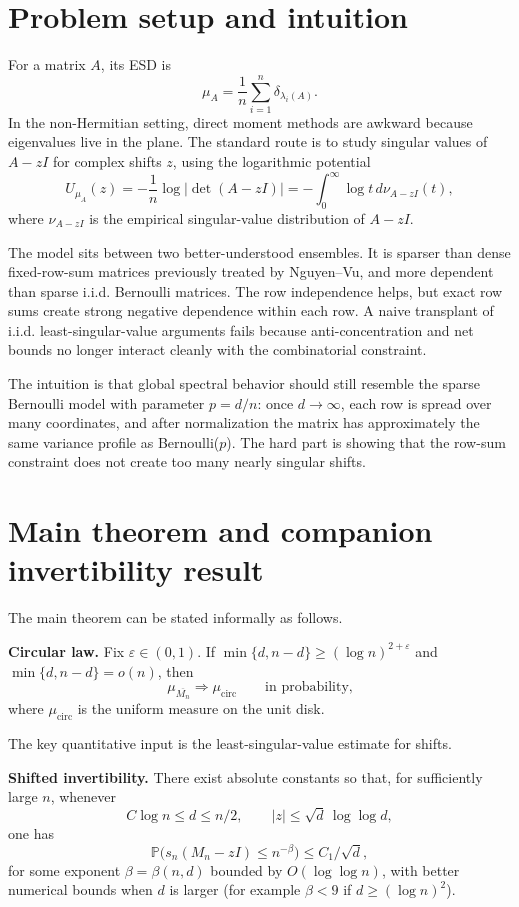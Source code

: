 \documentclass[11pt]{article}
\begin{document}
\section*{Problem setup and intuition}
For a matrix $A$, its ESD is
\[
\mu_A=\frac1n\sum_{i=1}^n \delta_{\lambda_i(A)}.
\]
In the non-Hermitian setting, direct moment methods are awkward because eigenvalues live in the plane. The standard route is to study singular values of $A-zI$ for complex shifts $z$, using the logarithmic potential
\[
U_{\mu_A}(z)=-\frac1n\log|\det(A-zI)|
      =-\int_0^{\infty}\log t\,d\nu_{A-zI}(t),
\]
where $\nu_{A-zI}$ is the empirical singular-value distribution of $A-zI$.

The model sits between two better-understood ensembles. It is sparser than dense fixed-row-sum matrices previously treated by Nguyen--Vu, and more dependent than sparse i.i.d. Bernoulli matrices. The row independence helps, but exact row sums create strong negative dependence within each row. A naive transplant of i.i.d. least-singular-value arguments fails because anti-concentration and net bounds no longer interact cleanly with the combinatorial constraint.

The intuition is that global spectral behavior should still resemble the sparse Bernoulli model with parameter $p=d/n$: once $d\to\infty$, each row is spread over many coordinates, and after normalization the matrix has approximately the same variance profile as Bernoulli($p$). The hard part is showing that the row-sum constraint does not create too many nearly singular shifts.

\section*{Main theorem and companion invertibility result}
The main theorem can be stated informally as follows.

\textbf{Circular law.} Fix $\varepsilon\in(0,1)$. If $\min\{d,n-d\}\ge (\log n)^{2+\varepsilon}$ and $\min\{d,n-d\}=o(n)$, then
\[
\mu_{\overline{M_n}} \Longrightarrow \mu_{\mathrm{circ}}
\qquad\text{in probability,}
\]
where $\mu_{\mathrm{circ}}$ is the uniform measure on the unit disk.

The key quantitative input is the least-singular-value estimate for shifts.

\textbf{Shifted invertibility.} There exist absolute constants so that, for sufficiently large $n$, whenever
\[
C\log n\le d\le n/2,
\qquad |z|\le \sqrt d\,\log\log d,
\]
one has
\[
\mathbb P\big(s_n(M_n-zI)\le n^{-\beta}\big)\le C_1/\sqrt d,
\]
for some exponent $\beta=\beta(n,d)$ bounded by $O(\log\log n)$, with better numerical bounds when $d$ is larger (for example $\beta<9$ if $d\ge (\log n)^2$).
\end{document}
